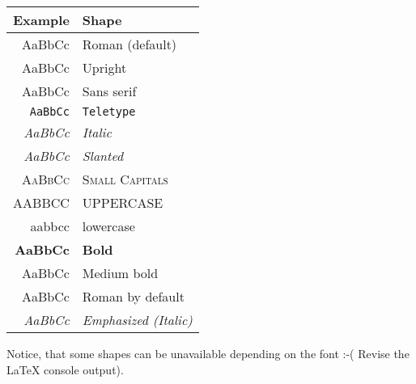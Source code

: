 \documentclass[12pt]{report}
\begin{document}
\begin{center}
  \Huge
  \begin{tabular}{r|l}
    Example & Shape \\
    \hline
    \hline
    \textrm{AaBbCc} & Roman (default) \\ 	
    \textup{AaBbCc} & \textup{Upright} \\
    \textsf{AaBbCc} & \textsf{Sans serif } \\
    \texttt{AaBbCc} & \texttt{Teletype} \\
    \textit{AaBbCc} & \textit{Italic} \\ 	
    \textsl{AaBbCc} & \textsl{Slanted} \\
    \hline
    \textsc{AaBbCc} & \textsc{Small Capitals} \\	
    \uppercase{AaBbCc} & \uppercase{Uppercase} \\
    \lowercase{AaBbCc} & \lowercase{Lowercase} \\
    \hline
    \textbf{AaBbCc} & \textbf{Bold} \\
    \textmd{AaBbCc} & \textmd{Medium bold} \\
    \hline
    \textnormal{AaBbCc} & \textnormal{Roman by default} \\
    \emph{AaBbCc}       & \emph{Emphasized (Italic)}
  \end{tabular}
\end{center}

Notice, that some shapes can be unavailable depending on the font
:-( Revise the LaTeX console output).
\end{document}
